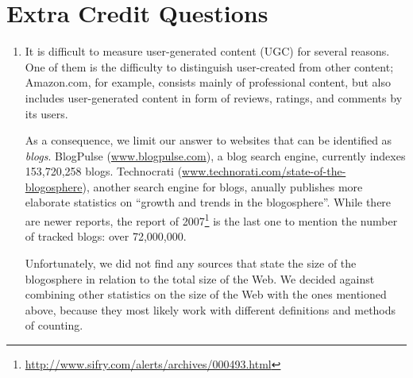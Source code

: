\documentclass[a4paper,11pt,oneside]{book}
\begin{document}
\chapter{Extra Credit Questions}

\begin{enumerate}
	\item It is difficult to measure user-generated content (UGC) for several reasons. One of them is the difficulty to distinguish user-created from other content; Amazon.com, for example, consists mainly of professional content, but also includes user-generated content in form of reviews, ratings, and comments by its users.
	
	As a consequence, we limit our answer to websites that can be identified as \emph{blogs}. BlogPulse (\url{www.blogpulse.com}), a blog search engine, currently indexes 153,720,258 blogs. Technocrati (\url{www.technorati.com/state-of-the-blogosphere}), another search engine for blogs, anually publishes more elaborate statistics on ``growth and trends in the blogo\-sphere''. While there are newer reports, the report of 2007\footnote{\url{http://www.sifry.com/alerts/archives/000493.html}} is the last one to mention the number of tracked blogs: over 72,000,000. 
	
	Unfortunately, we did not find any sources that state the size of the blogo\-sphere in relation to the total size of the Web. We decided against combining other statistics on the size of the Web with the ones mentioned above, because they most likely work with different definitions and methods of counting.
\end{enumerate}


\end{document}
